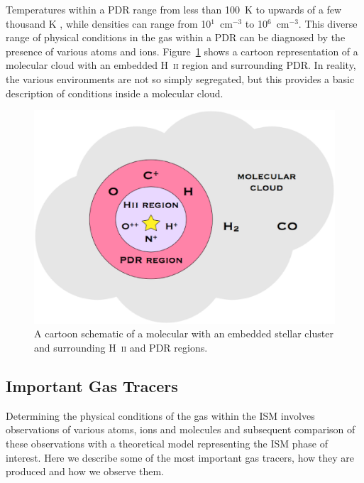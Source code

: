 Temperatures within a PDR range from less than 100~K to upwards of a few thousand K \citep{1985ApJ...291..722T}, while densities can range from 10$^{1}$~cm$^{-3}$ to 10$^{6}$~cm$^{-3}$.  This diverse range of physical conditions in the gas within a PDR can be diagnosed by the presence of various atoms and ions.  Figure~\ref{fig:cloud} shows a cartoon representation of a molecular cloud with an embedded H~\textsc{ii} region and surrounding PDR.  In reality, the various environments are not so simply segregated, but this provides a basic description of conditions inside a molecular cloud.  


\begin{figure}[!h]
 \begin{center}
 \includegraphics[width=\columnwidth]{ch1/molecular_cloud_schematic.eps}
  \caption[A cartoon of a molecular cloud]{A cartoon schematic of a molecular with an embedded stellar cluster and surrounding H~\textsc{ii} and PDR regions.
  \label{fig:cloud}}
 \end{center}
\end{figure}

\subsection{Important Gas Tracers} \label{gas_tracer}
Determining the physical conditions of the gas within the ISM involves observations of various atoms, ions and molecules and subsequent comparison of these observations with a theoretical model representing the ISM phase of interest.  Here we describe some of the most important gas tracers, how they are produced and how we observe them.

